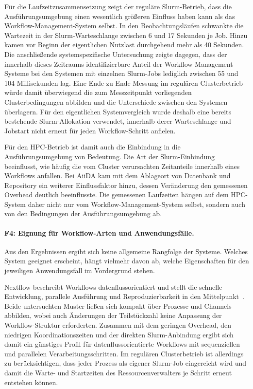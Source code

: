 Für die Laufzeitzusammensetzung zeigt der reguläre Slurm-Betrieb,
dass die Ausführungsumgebung einen wesentlich größeren Einfluss
haben kann als das Workflow-Management-System selbst. In den
Beobachtungsläufen schwankte die Wartezeit in der
Slurm-Warteschlange zwischen 6 und 17 Sekunden je Job. Hinzu kamen
vor Beginn der eigentlichen Nutzlast durchgehend mehr als
40 Sekunden. Die anschließende systemspezifische Untersuchung
zeigte dagegen, dass der innerhalb dieses Zeitraums
identifizierbare Anteil der Workflow-Management-Systeme bei den
Systemen mit einzelnen Slurm-Jobs lediglich zwischen 55 und
104 Millisekunden lag. Eine Ende-zu-Ende-Messung im regulären
Clusterbetrieb würde damit überwiegend die zum Messzeitpunkt
vorliegenden Clusterbedingungen abbilden und die Unterschiede
zwischen den Systemen überlagern. Für den eigentlichen Systemvergleich wurde deshalb eine bereits bestehende Slurm-Allokation verwendet, innerhalb derer
Warteschlange und Jobstart nicht erneut für jeden Workflow-Schritt
anfielen.

Für den HPC-Betrieb ist damit auch die Einbindung in die
Ausführungsumgebung von Bedeutung. Die Art der Slurm-Einbindung beeinflusst, wie häufig die vom Cluster verursachten Zeitanteile innerhalb eines
Workflows anfallen. Bei AiiDA kam mit dem Ablageort von Datenbank
und Repository ein weiterer Einflussfaktor hinzu, dessen
Veränderung den gemessenen Overhead deutlich beeinflusste. Die gemessenen Laufzeiten hängen auf dem HPC-System daher nicht nur
vom Workflow-Management-System selbst, sondern auch von den
Bedingungen der Ausführungsumgebung ab.

\paragraph{F4: Eignung für Workflow-Arten und Anwendungsfälle.}
Aus den Ergebnissen ergibt sich keine allgemeine Rangfolge der
Systeme. Welches System geeignet erscheint, hängt vielmehr davon
ab, welche Eigenschaften für den jeweiligen Anwendungsfall im
Vordergrund stehen.

Nextflow beschreibt Workflows datenflussorientiert und stellt die
schnelle Entwicklung, parallele Ausführung und Reproduzierbarkeit
in den Mittelpunkt~\cite{ditommaso2017nextflow}. Beide untersuchten
Muster ließen sich kompakt über Prozesse und Channels abbilden, wobei
auch Änderungen der Teilstückzahl keine Anpassung der
Workflow-Struktur erforderten. Zusammen mit dem geringen Overhead,
den niedrigen Koordinationszeiten und der direkten Slurm-Anbindung
ergibt sich damit ein günstiges Profil für datenflussorientierte
Workflows mit sequenziellen und parallelen Verarbeitungsschritten.
Im regulären Clusterbetrieb ist allerdings zu berücksichtigen, dass
jeder Prozess als eigener Slurm-Job eingereicht wird und damit die
Warte- und Startzeiten des Ressourcenverwalters je Schritt erneut
entstehen können.

